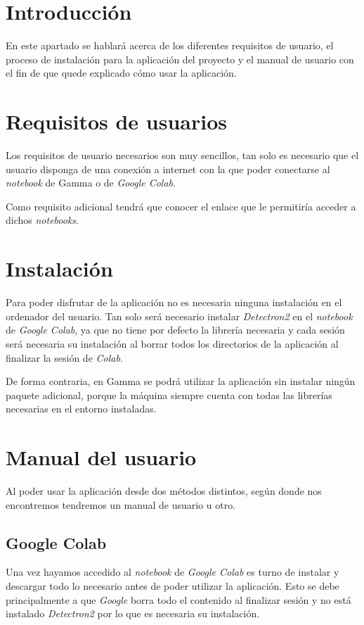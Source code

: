 
\section{Introducción}
En este apartado se hablará acerca de los diferentes requisitos de usuario, el proceso de instalación para la aplicación del proyecto y el manual de usuario con el fin de que quede explicado cómo usar la aplicación.

\section{Requisitos de usuarios}
Los requisitos de usuario necesarios son muy sencillos, tan solo es necesario que el usuario disponga de una conexión a internet con la que poder conectarse al \emph{notebook} de Gamma o de \emph{Google Colab}.

Como requisito adicional tendrá que conocer el enlace que le permitiría acceder a dichos \emph{notebooks}.

\section{Instalación}
Para poder disfrutar de la aplicación no es necesaria ninguna instalación en el ordenador del usuario. Tan solo será necesario instalar \emph{Detectron2} en el \emph{notebook} de \emph{Google Colab}, ya que no tiene por defecto la librería necesaria y cada sesión será necesaria su instalación al borrar todos los directorios de la aplicación al finalizar la sesión de \emph{Colab}.

De forma contraria, en Gamma se podrá utilizar la aplicación sin instalar ningún paquete adicional, porque la máquina siempre cuenta con todas las librerías necesarias en el entorno instaladas.

\section{Manual del usuario}
Al poder usar la aplicación desde dos métodos distintos, según donde nos encontremos tendremos un manual de usuario u otro.

\subsection{Google Colab}
Una vez hayamos accedido al \emph{notebook} de \emph{Google Colab} es turno de instalar y descargar todo lo necesario antes de poder utilizar la aplicación. Esto se debe principalmente a que \emph{Google} borra todo el contenido al finalizar sesión y no está instalado \emph{Detectron2} por lo que es necesaria su instalación.

